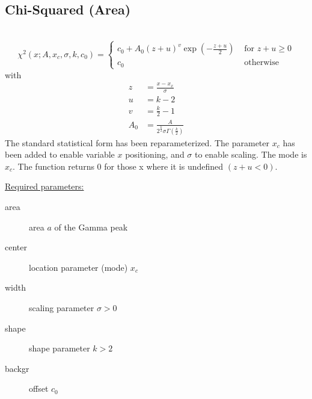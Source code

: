 \subsection{Chi-Squared (Area)} ~\\
\label{sec:ChiSquaredArea}
\begin{equation}
\chi^2(x;A,x_c,\sigma,k,c_0) =
\begin{cases}
c_0+A_0 \left(z+u\right)^{v} \exp\left(-\frac{z+u}{2}\right) & \mbox{ for } z+u \geq 0 \\
c_0 & \mbox{ otherwise}
\end{cases}
\end{equation}
with
\begin{align}
z &= \frac{x-x_x}{\sigma} \\
u &= k-2 \\
v &= \frac{k}{2}-1 \\
A_0 &= \frac{A}{ 2^{\frac{k}{2}} \sigma\Gamma\left(\frac{k}{2}\right)}
\end{align}
The standard statistical form has been reparameterized. The parameter $x_c$ has been added
to enable variable $x$ positioning, and $\sigma$ to enable scaling. The mode is $x_c$.
The function returns 0 for those x where it is undefined $(z+u<0)$.

\vspace{5mm}

\underline{Required parameters:}
\begin{description}
    \item[area] area $a$ of the Gamma peak
    \item[center] location parameter (mode) $x_c$
    \item[width] scaling parameter $\sigma>0$
    \item[shape] shape parameter $k>2$
    \item[backgr] offset $c_0$
\end{description}

